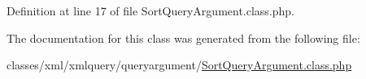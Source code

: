 Definition at line 17 of file Sort\+Query\+Argument.\+class.\+php.



The documentation for this class was generated from the following file\+:\begin{DoxyCompactItemize}
\item 
classes/xml/xmlquery/queryargument/\hyperlink{SortQueryArgument_8class_8php}{Sort\+Query\+Argument.\+class.\+php}\end{DoxyCompactItemize}
